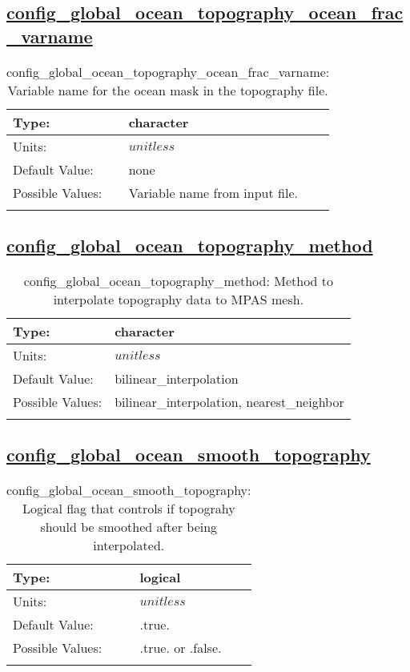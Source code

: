 \subsection[config\_global\_ocean\_topography\_ocean\_frac\_varname]{\hyperref[sec:nm_tab_global_ocean]{config\_global\_ocean\_topography\_ocean\_frac\_varname}}
\label{subsec:nm_sec_config_global_ocean_topography_ocean_frac_varname}
\begin{center}
\begin{longtable}{| p{2.0in} || p{4.0in} |}
    \hline
    Type: & character \\
    \hline
    Units: & $unitless$ \\
    \hline
    Default Value: & none \\
    \hline
    Possible Values: & Variable name from input file. \\
    \hline
    \caption{config\_global\_ocean\_topography\_ocean\_frac\_varname: Variable name for the ocean mask in the topography file.}
\end{longtable}
\end{center}
\subsection[config\_global\_ocean\_topography\_method]{\hyperref[sec:nm_tab_global_ocean]{config\_global\_ocean\_topography\_method}}
\label{subsec:nm_sec_config_global_ocean_topography_method}
\begin{center}
\begin{longtable}{| p{2.0in} || p{4.0in} |}
    \hline
    Type: & character \\
    \hline
    Units: & $unitless$ \\
    \hline
    Default Value: & bilinear\_interpolation \\
    \hline
    Possible Values: & bilinear\_interpolation, nearest\_neighbor \\
    \hline
    \caption{config\_global\_ocean\_topography\_method: Method to interpolate topography data to MPAS mesh.}
\end{longtable}
\end{center}
\subsection[config\_global\_ocean\_smooth\_topography]{\hyperref[sec:nm_tab_global_ocean]{config\_global\_ocean\_smooth\_topography}}
\label{subsec:nm_sec_config_global_ocean_smooth_topography}
\begin{center}
\begin{longtable}{| p{2.0in} || p{4.0in} |}
    \hline
    Type: & logical \\
    \hline
    Units: & $unitless$ \\
    \hline
    Default Value: & .true. \\
    \hline
    Possible Values: & .true. or .false. \\
    \hline
    \caption{config\_global\_ocean\_smooth\_topography: Logical flag that controls if topograhy should be smoothed after being interpolated.}
\end{longtable}
\end{center}
